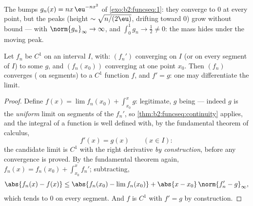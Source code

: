 \begin{omfigure}

{\small The bumps $g_n(x) = nx\,\eu^{-nx^2}$ of
\cref{exo:b2:funcseq:1}: they converge to $0$ at every point,
but the peaks (height $\sim\sqrt{n/(2\eu)}$, drifting toward
$0$) grow without bound ---  with
$\norm{g_n}_\infty \to \infty$, and $\int_0^1 g_n \to \frac12
\neq 0$: the mass hides under the moving peak.}
\end{omfigure}

\begin{theorem}[Differentiation]\label{thm:b2:funcseq:differentiation}
Let $f_n$ be $C^1$ on an interval $I$, with: $(f_n')$ converging
\emph{} on $I$ (or on every segment of $I$) to some $g$,
and $(f_n(x_0))$ converging at one point $x_0$. Then $(f_n)$
converges ( on segments) to a $C^1$ function $f$, and $f'
= g$: one may differentiate the limit.
\end{theorem}

\begin{proof}
Define $f(x) = \lim f_n(x_0) + \int_{x_0}^x g$: legitimate, $g$
being  --- indeed $g$ is the \emph{uniform} limit on
segments of the  $f_n'$, so
\cref{thm:b2:funcseq:continuity} applies, and the integral of
a  function is well defined with, by the fundamental
theorem of calculus,
\[
f'(x) = g(x) \qquad (x \in I) :
\]
the candidate limit is $C^1$ with the right derivative
\emph{by construction}, before any convergence is proved. By
the fundamental theorem again, $f_n(x) = f_n(x_0) + \int_{x_0}^x
f_n'$; subtracting,
\[
\abs{f_n(x) - f(x)} \leq \abs{f_n(x_0) - \lim f_n(x_0)}
+ \abs{x - x_0}\,\norm{f_n' - g}_{\infty} ,
\]
which tends to $0$  on every segment. And $f$ is $C^1$
with $f' = g$ by construction.
\end{proof}

